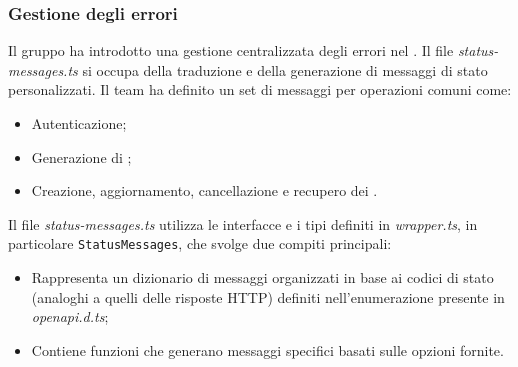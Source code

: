 \subsubsection{Gestione degli errori} \label{GestioneErrori}

\par Il gruppo ha introdotto una gestione centralizzata degli errori nel . Il file \textit{status-messages.ts} si occupa della traduzione e della generazione di messaggi di stato personalizzati. Il team ha definito un set di messaggi per operazioni comuni come:
\begin{itemize}
  \item Autenticazione;
  \item Generazione di ;
  \item Creazione, aggiornamento, cancellazione e recupero dei .
\end{itemize}

\vspace{0.5\baselineskip}
\par Il file \textit{status-messages.ts} utilizza le interfacce e i tipi definiti in \textit{wrapper.ts}, in particolare \texttt{StatusMessages}, che svolge due compiti principali:
\begin{itemize}
  \item Rappresenta un dizionario di messaggi organizzati in base ai codici di stato (analoghi a quelli delle risposte HTTP) definiti nell'enumerazione presente in \textit{openapi.d.ts};
  \item Contiene funzioni che generano messaggi specifici basati sulle opzioni fornite.
\end{itemize}